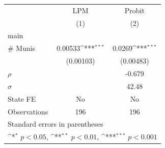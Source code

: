 {
\def\sym#1{\ifmmode^{#1}\else\(^{#1}\)\fi}
\begin{tabular}{l*{2}{c}}
\toprule
                    &\multicolumn{1}{c}{LPM}&\multicolumn{1}{c}{Probit}\\
                    &\multicolumn{1}{c}{(1)}         &\multicolumn{1}{c}{(2)}         \\
\midrule
main                &                     &                     \\
\# Munis            &     0.00533\sym{***}&      0.0269\sym{***}\\
                    &   (0.00103)         &   (0.00483)         \\
\midrule
\(\rho\)            &                     &      -0.679         \\
\(\sigma\)          &                     &       42.48         \\
State FE            &          No         &          No         \\
Observations        &         196         &         196         \\
\bottomrule
\multicolumn{3}{l}{\footnotesize Standard errors in parentheses}\\
\multicolumn{3}{l}{\footnotesize \sym{*} \(p<0.05\), \sym{**} \(p<0.01\), \sym{***} \(p<0.001\)}\\
\end{tabular}
}
